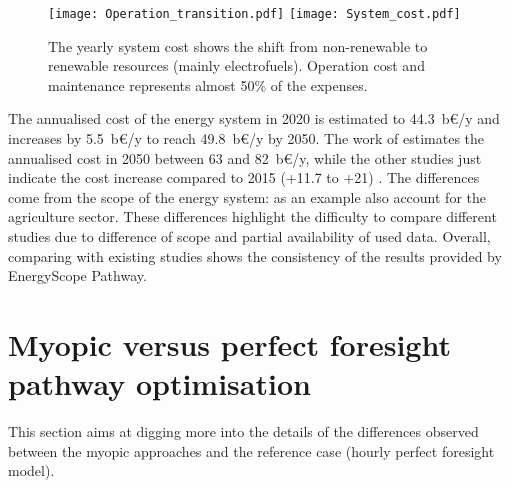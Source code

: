 \begin{figure}[!htbp] %
\centering
\texttt{[image: Operation\_transition.pdf]}
\texttt{[image: System\_cost.pdf]}
\caption{The yearly system cost shows the shift from non-renewable to renewable resources (mainly electrofuels). Operation cost and maintenance represents almost 50\% of the expenses.}
\label{fig:pestd_cumul_op}
\end{figure}

The annualised cost of the energy system in 2020 is estimated to 44.3~b€/y and increases by 5.5~b€/y to reach 49.8~b€/y by 2050. The work of \citet{My2050} estimates the annualised cost in 2050 between 63 and 82~b€/y, while the other studies just indicate the cost increase compared to 2015 (+11.7 to +21) \citep{Devogelaer2013,PATHS2050}. The differences come from the scope of the energy system: as an example \citet{My2050} also account for the agriculture sector. These differences highlight the difficulty to compare different studies due to difference of scope and partial availability of used data. Overall, comparing with existing studies shows the consistency of the results provided by EnergyScope Pathway.

\section{Myopic versus perfect foresight pathway optimisation}
\label{app:my_vs_pf}
This section aims at digging more into the details of the differences observed between the myopic approaches and the reference case (\ie hourly perfect foresight model).


